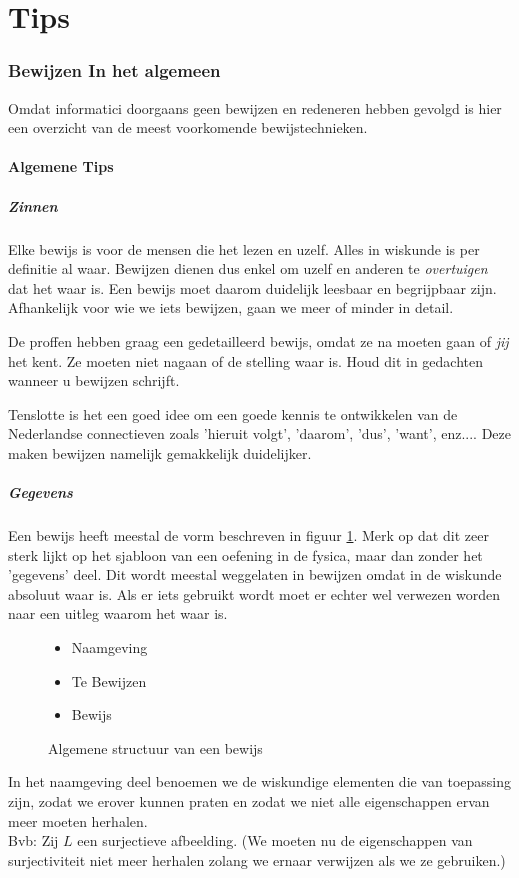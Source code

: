 \documentclass[lineaire_algebra_oplossingen.tex]{subfiles}
\begin{document}
\newpage
\part{Tips}
\section{Bewijzen In het algemeen}
Omdat informatici doorgaans geen bewijzen en redeneren hebben gevolgd is hier een overzicht van de meest voorkomende bewijstechnieken.

\subsection{Algemene Tips}
\subsubsection{Zinnen}
Elke bewijs is voor de mensen die het lezen en uzelf. Alles in wiskunde is per definitie al waar. Bewijzen dienen dus enkel om uzelf en anderen te \emph{overtuigen} dat het waar is. Een bewijs moet daarom duidelijk leesbaar en begrijpbaar zijn. Afhankelijk voor wie we iets bewijzen, gaan we meer of minder in detail. 

De proffen hebben graag een gedetailleerd bewijs, omdat ze na moeten gaan of \emph{jij} het kent. Ze moeten niet nagaan of de stelling waar is. Houd dit in gedachten wanneer u bewijzen schrijft.

Tenslotte is het een goed idee om een goede kennis te ontwikkelen van de Nederlandse connectieven zoals 'hieruit volgt', 'daarom', 'dus', 'want', enz.... Deze maken bewijzen namelijk gemakkelijk duidelijker.
\subsubsection{Gegevens}
Een bewijs heeft meestal de vorm beschreven in figuur \ref{algemeen_bewijs}. Merk op dat dit zeer sterk lijkt op het sjabloon van een oefening in de fysica, maar dan zonder het 'gegevens' deel. Dit wordt meestal weggelaten in bewijzen omdat in de wiskunde absoluut waar is. Als er iets gebruikt wordt moet er echter wel verwezen worden naar een uitleg waarom het waar is.
\begin{figure}[H]
\begin{itemize}
\item Naamgeving
\item Te Bewijzen
\item Bewijs
\end{itemize}
\caption{Algemene structuur van een bewijs}
\label{algemeen_bewijs}
\end{figure}
In het naamgeving deel benoemen we de wiskundige elementen die van toepassing zijn, zodat we erover kunnen praten en zodat we niet alle eigenschappen ervan meer moeten herhalen.\\
Bvb: Zij $L$ een surjectieve afbeelding. (We moeten nu de eigenschappen van surjectiviteit niet meer herhalen zolang we ernaar verwijzen als we ze gebruiken.)
\end{document}
